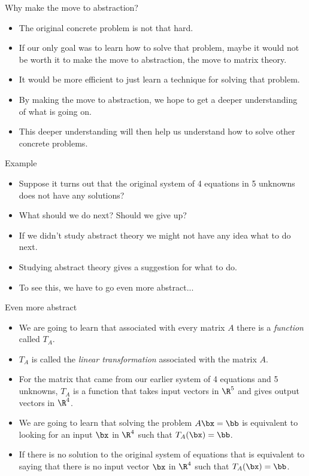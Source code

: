 \documentclass{beamer}
\begin{document}
\begin{frame} {Why make the move to abstraction?}
\begin{itemize}
\item The original concrete problem is not that hard.
\item If our only goal was to learn how to solve that problem, maybe it would
not be worth it to make the move to abstraction, the move to matrix
theory.
\item It would be more efficient to just learn a technique for solving that problem.
\item By making the move to abstraction, we hope to get a deeper understanding
of what is going on.
\item This deeper understanding will then help us understand how to solve
other concrete problems.
\end{itemize}
\end{frame}

\begin{frame} {Example}
\begin{itemize}
\item Suppose it turns out that the original system of 4 equations in 5 unknowns
does not have any solutions?
\item What should we do next?  Should we give up?
\item If we didn't study abstract theory we might
not have any idea what to do next.
\item Studying abstract theory gives a suggestion for what to do.
\item To see this, we have to go even more abstract...
\end{itemize}
\end{frame}


\begin{frame} {Even more abstract}
\begin{itemize}
\item We are going to learn that associated with every matrix $A$ there is
a \emph{function} called $T_A$.
\item $T_A$ is called the \emph{linear transformation} associated with the
matrix $A$.
\item For the matrix that came from our earlier system of 4 equations and 5 unknowns,
$T_A$ is a function that takes input vectors in $\R^5$ and gives output vectors in $\R^4$.
\item We are going to learn that solving the problem $A \bx = \bb$ is equivalent
to looking for an input $\bx$ in $\R^4$ such that $T_A(\bx) = \bb$.
\item If there is no solution to the original system of equations that is
equivalent to saying that there is no input vector $\bx$ in $\R^4$ such that $T_A(\bx) = \bb$.
\end{itemize}
\end{frame}
\end{document}

